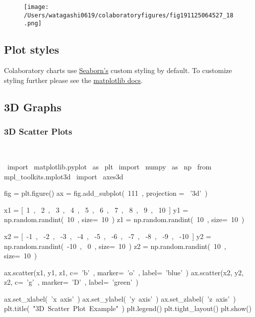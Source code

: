 \begin{figure}[H]
\centering
\texttt{[image: /Users/watagashi0619/colaboratoryfigures/fig191125064527\_18.png]}
\end{figure}
\subsection{Plot styles}
Colaboratory charts use \href{https://seaborn.pydata.org}{Seaborn's} custom styling by default. To customize styling further please see the \href{https://matplotlib.org/users/style\_sheets.html}{matplotlib docs}.\\
\subsection{3D Graphs}
\subsubsection{3D Scatter Plots}

\begin{paracol}{2}
\smallskip
\begin{cellExecute}[escapechar=~]
~~
\end{cellExecute}
\switchcolumn
\begin{codeCell}[escapechar=~]
~\textcolor{mtk17}{import}~ matplotlib.pyplot ~\textcolor{mtk17}{as}~ plt
~\textcolor{mtk17}{import}~ numpy ~\textcolor{mtk17}{as}~ np
~\textcolor{mtk17}{from}~ mpl_toolkits.mplot3d ~\textcolor{mtk17}{import}~ axes3d

fig = plt.figure()
ax = fig.add_subplot(~\textcolor{mtk7}{111}~, projection = ~\textcolor{mtk25}{'3d'}~)

x1 = [~\textcolor{mtk7}{1}~, ~\textcolor{mtk7}{2}~, ~\textcolor{mtk7}{3}~, ~\textcolor{mtk7}{4}~, ~\textcolor{mtk7}{5}~, ~\textcolor{mtk7}{6}~, ~\textcolor{mtk7}{7}~, ~\textcolor{mtk7}{8}~, ~\textcolor{mtk7}{9}~, ~\textcolor{mtk7}{10}~]
y1 = np.random.randint(~\textcolor{mtk7}{10}~, size=~\textcolor{mtk7}{10}~)
z1 = np.random.randint(~\textcolor{mtk7}{10}~, size=~\textcolor{mtk7}{10}~)

x2 = [~\textcolor{mtk7}{-1}~, ~\textcolor{mtk7}{-2}~, ~\textcolor{mtk7}{-3}~, ~\textcolor{mtk7}{-4}~, ~\textcolor{mtk7}{-5}~, ~\textcolor{mtk7}{-6}~, ~\textcolor{mtk7}{-7}~, ~\textcolor{mtk7}{-8}~, ~\textcolor{mtk7}{-9}~, ~\textcolor{mtk7}{-10}~]
y2 = np.random.randint(~\textcolor{mtk7}{-10}~, ~\textcolor{mtk7}{0}~, size=~\textcolor{mtk7}{10}~)
z2 = np.random.randint(~\textcolor{mtk7}{10}~, size=~\textcolor{mtk7}{10}~)

ax.scatter(x1, y1, z1, c=~\textcolor{mtk25}{'b'}~, marker=~\textcolor{mtk25}{'o'}~, label=~\textcolor{mtk25}{'blue'}~)
ax.scatter(x2, y2, z2, c=~\textcolor{mtk25}{'g'}~, marker=~\textcolor{mtk25}{'D'}~, label=~\textcolor{mtk25}{'green'}~)

ax.set_xlabel(~\textcolor{mtk25}{'x axis'}~)
ax.set_ylabel(~\textcolor{mtk25}{'y axis'}~)
ax.set_zlabel(~\textcolor{mtk25}{'z axis'}~)
plt.title(~\textcolor{mtk25}{"3D Scatter Plot Example"}~)
plt.legend()
plt.tight_layout()
plt.show()
\end{codeCell}
\end{paracol}

